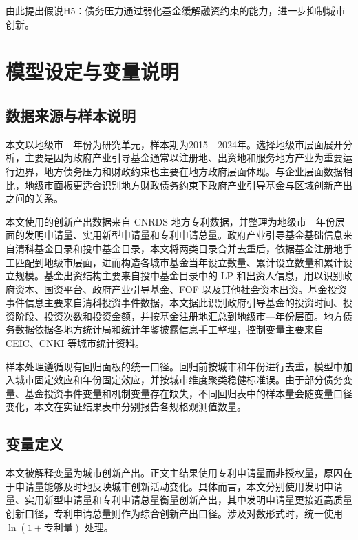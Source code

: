 \documentclass[UTF8,a4paper,zihao=5,fontset=fandol]{ctexart}
\begin{document}
由此提出假说H5：债务压力通过弱化基金缓解融资约束的能力，进一步抑制城市创新。




\section{模型设定与变量说明}

\subsection{数据来源与样本说明}

本文以地级市—年份为研究单元，样本期为2015—2024年。选择地级市层面展开分析，主要是因为政府产业引导基金通常以注册地、出资地和服务地方产业为重要运行边界，地方债务压力和财政约束也主要在地方政府层面体现。与企业层面数据相比，地级市面板更适合识别地方财政债务约束下政府产业引导基金与区域创新产出之间的关系。

本文使用的创新产出数据来自 CNRDS 地方专利数据，并整理为地级市—年份层面的发明申请量、实用新型申请量和专利申请总量。政府产业引导基金基础信息来自清科基金目录和投中基金目录，本文将两类目录合并去重后，依据基金注册地手工匹配到地级市层面，进而构造各城市基金当年设立数量、累计设立数量和累计设立规模。基金出资结构主要来自投中基金目录中的 LP 和出资人信息，用以识别政府资本、国资平台、政府产业引导基金、FOF 以及其他社会资本出资。基金投资事件信息主要来自清科投资事件数据，本文据此识别政府引导基金的投资时间、投资阶段、投资次数和投资金额，并按基金注册地汇总到地级市—年份层面。地方债务数据依据各地方统计局和统计年鉴披露信息手工整理，控制变量主要来自 CEIC、CNKI 等城市统计资料。

样本处理遵循现有回归面板的统一口径。回归前按城市和年份进行去重，模型中加入城市固定效应和年份固定效应，并按城市维度聚类稳健标准误。由于部分债务变量、基金投资事件变量和机制变量存在缺失，不同回归表中的样本量会随变量口径变化，本文在实证结果表中分别报告各规格观测值数量。

\subsection{变量定义}

本文被解释变量为城市创新产出。正文主结果使用专利申请量而非授权量，原因在于申请量能够及时地反映城市创新活动变化。具体而言，本文分别使用发明申请量、实用新型申请量和专利申请总量衡量创新产出，其中发明申请量更接近高质量创新口径，专利申请总量则作为综合创新产出口径。涉及对数形式时，统一使用 $\ln(1+\text{专利量})$ 处理。
\end{document}
